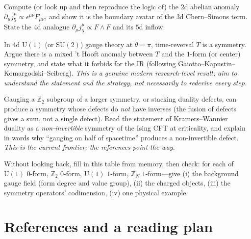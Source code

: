 \documentclass[11pt]{article}
\newcommand{\Uone}{\mathrm{U}(1)}
\newcommand{\Ztwo}{\mathbb{Z}_2}
\newcommand{\ZN}{\mathbb{Z}_N}
\begin{document}
\begin{xca}
Compute (or look up and then reproduce the logic of) the $2$d abelian anomaly
$\partial_\mu j_5^\mu \propto \epsilon^{\mu\nu}F_{\mu\nu}$, and show it is the boundary
avatar of the $3$d Chern--Simons term. State the $4$d analogue
$\partial_\mu j_5^\mu\propto F\wedge F$ and its $5$d inflow.
\end{xca}

\begin{xca}[\textbf{(thinker)} $\theta=\pi$ and a mixed anomaly]
In $4$d $\Uone$ (or $\mathrm{SU}(2)$) gauge theory at $\theta=\pi$, time-reversal $T$ is
a symmetry. Argue there is a mixed 't Hooft anomaly between $T$ and the $1$-form (or
center) symmetry, and state what it forbids for the IR (following
Gaiotto--Kapustin--Komargodski--Seiberg). \emph{This is a genuine modern research-level
result; aim to understand the statement and the strategy, not necessarily to rederive
every step.}
\end{xca}

\begin{xca}
Gauging a $\Ztwo$ subgroup of a larger symmetry, or stacking duality defects, can
produce a symmetry whose defects do \emph{not} have inverses (the fusion of defects
gives a sum, not a single defect). Read the statement of Kramers--Wannier duality as a
\emph{non-invertible} symmetry of the Ising CFT at criticality, and explain in words why
``gauging on half of spacetime'' produces a non-invertible defect. \emph{This is the
current frontier; the references point the way.}
\end{xca}

\begin{xca}
Without looking back, fill in this table from memory, then check: for each of
$\Uone$ $0$-form, $\Ztwo$ $0$-form, $\Uone$ $1$-form, $\ZN$ $1$-form---give (i) the
background gauge field (form degree and value group), (ii) the charged objects,
(iii) the symmetry operators' codimension, (iv) one physical example.
\end{xca}

\section*{References and a reading plan}
\end{document}
